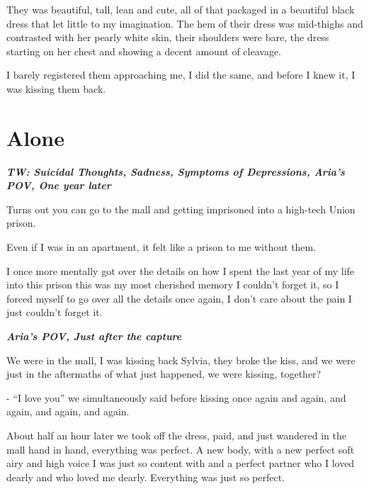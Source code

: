 \documentclass[colorlinks,12pt,a4paper]{book}
\begin{document}
 They was beautiful, tall, lean and cute, all of that packaged in a beautiful black dress that let little to my imagination. 
 The hem of their dress was mid-thighs and contrasted with her pearly white skin, their shoulders were bare, 
 the dress starting on her chest and showing a decent amount of cleavage.\par
 \bigskip
 
 I barely registered them approaching me, I did the same, and before I knew it, I was kissing them back.\par
 \bigskip 

 \chapter{Alone}

\textit{\textbf{TW: Suicidal Thoughts, Sadness, Symptoms of Depressions, Aria's POV, One year later}}\par
\bigskip

Turns out you can go to the mall and getting imprisoned into a high-tech Union prison.\par
\bigskip

Even if I was in an apartment, it felt like a prison to me without them.\par
\bigskip

I once more mentally got over the details on how I spent the last year of my life into this prison this was my most 
cherished memory I couldn't forget it, so I forced myself to go over all the details once again, I don't care about the 
pain I just couldn't forget it.\par
\bigskip

\textit{\textbf{Aria's POV, Just after the capture}}\par
\bigskip

We were in the mall, I was kissing back Sylvia, they broke the kiss, and we were just in the aftermaths of what just 
happened, we were kissing, together?\par
\bigskip

- “I love you” we simultaneously said before kissing once again
and again, and again, and again, and again.\par
\bigskip

About half an hour later we took off the dress, paid, and just wandered in the mall hand in hand, everything was perfect.
A new body, with a new perfect soft airy and high voice I was just so content with and a perfect partner who I loved dearly 
and who loved me dearly. Everything was just so perfect.\par
\bigskip
\end{document}
